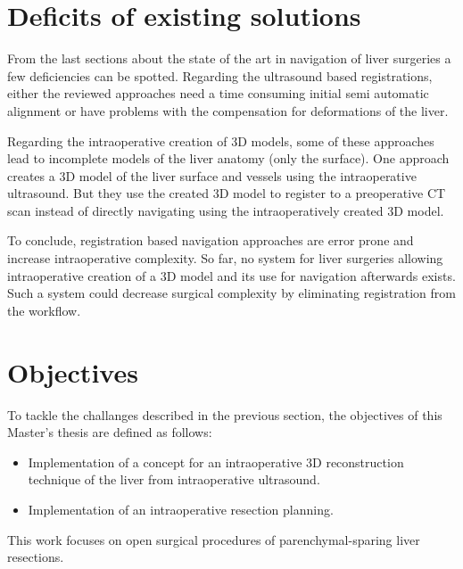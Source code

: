


\section{Deficits of existing solutions}
From the last sections about the state of the art in navigation of liver
surgeries a few deficiencies  can be spotted. Regarding the ultrasound based
registrations, either the reviewed approaches
need a time consuming initial semi automatic alignment or have problems with the
compensation for deformations of the liver. 

Regarding the intraoperative creation of 3D models, some of these approaches lead to
incomplete models of the liver anatomy (only the surface). One approach creates
a 3D model of the liver surface and vessels using the intraoperative ultrasound.
But they use the created 3D model to register to a preoperative CT scan instead
of directly navigating using the intraoperatively created 3D model.

To conclude, registration based navigation approaches are error prone and
increase intraoperative complexity. So far, no system for liver surgeries allowing intraoperative creation of a 3D model and
its use for navigation afterwards exists. Such a system could decrease surgical
complexity by eliminating registration from the workflow.


\section{Objectives} 
To tackle the challanges described in the previous section, the
objectives of this Master's thesis are defined as follows:
\begin{itemize}
  \item Implementation of a concept for an intraoperative 3D reconstruction
  technique of the liver from intraoperative ultrasound. 
  \item Implementation of an intraoperative resection planning.
\end{itemize}
This work focuses on open surgical procedures of parenchymal-sparing liver resections.





